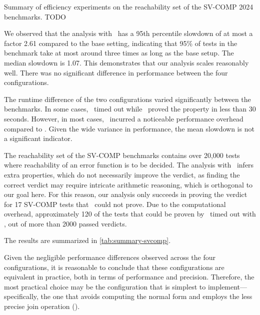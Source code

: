 \begin{table}[t]
    \centering
    \caption{Summary of efficiency experiments on the reachability set
    of the SV-COMP 2024 benchmarks. TODO}
    \label{tab:summary-svcomp}
    
\end{table}

We observed that the analysis with \cpo\ has a 95th percentile slowdown of at most a factor 2.61 compared to the base setting,
indicating that 95\% of tests in the benchmark take at most around three times as long as the base setup.
The median slowdown is 1.07.
This demonstrates that our analysis scales reasonably well.
There was no significant difference in performance between the four configurations.

The runtime difference of the two configurations varied significantly between the benchmarks.
In some cases, \base\ timed out while \cpo\ proved the property in less than 30 seconds.
However, in most cases, \cpo\ incurred a noticeable performance overhead compared to \base.
Given the wide variance in performance, the mean slowdown is not a significant indicator.

The reachability set of the SV-COMP benchmarks contains over 20,000 tests
where reachability of an error function is to be decided.
The analysis with \cpo\ infers extra properties, which do not necessarily improve the verdict,
as finding the correct verdict may require intricate arithmetic reasoning, which is orthogonal to our goal here.
For this reason, our analysis only succeeds in proving the verdict for 17 SV-COMP tests that \base\ could not prove.
Due to the computational overhead, approximately 120 of the tests that could be proven by \base\ timed out with \cpo,
out of more than 2000 passed verdicts.

The results are summarized in \cref{tab:summary-svcomp}.

Given the negligible performance differences observed across the four configurations, it is reasonable to conclude that these configurations are equivalent in practice, both in terms of performance and precision.
Therefore, the most practical choice may be the configuration that is simplest to implement---specifically, the one that avoids computing the normal form and employs the less precise join operation (\cpoq).

